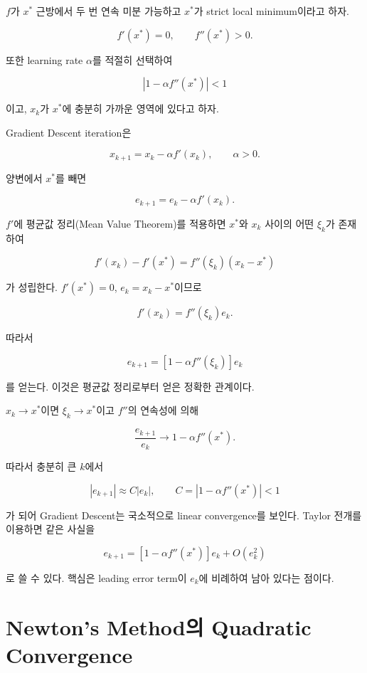 \documentclass[11pt,a4paper]{article}
\begin{document}
$f$가 $x^*$ 근방에서 두 번 연속 미분 가능하고 $x^*$가 strict local minimum이라고 하자.

\[
    f'(x^*)=0,
    \qquad
    f''(x^*)>0.
\]

또한 learning rate $\alpha$를 적절히 선택하여

\[
    |1-\alpha f''(x^*)|<1
\]

이고, $x_k$가 $x^*$에 충분히 가까운 영역에 있다고 하자.

Gradient Descent iteration은

\[
    x_{k+1}=x_k-\alpha f'(x_k),
    \qquad \alpha>0.
\]

양변에서 $x^*$를 빼면

\[
    e_{k+1}
    =
    e_k-\alpha f'(x_k).
\]

$f'$에 평균값 정리(Mean Value Theorem)를 적용하면 $x^*$와 $x_k$ 사이의
어떤 $\xi_k$가 존재하여

\[
    f'(x_k)-f'(x^*)
    =
    f''(\xi_k)(x_k-x^*)
\]

가 성립한다. $f'(x^*)=0$, $e_k=x_k-x^*$이므로

\[
    f'(x_k)=f''(\xi_k)e_k.
\]

따라서

\[
    \boxed{
    e_{k+1}
    =
    \left[1-\alpha f''(\xi_k)\right]e_k
    }
\]

를 얻는다. 이것은 평균값 정리로부터 얻은 정확한 관계이다.

$x_k\to x^*$이면 $\xi_k\to x^*$이고 $f''$의 연속성에 의해

\[
    \frac{e_{k+1}}{e_k}
    \longrightarrow
    1-\alpha f''(x^*).
\]

따라서 충분히 큰 $k$에서

\[
    |e_{k+1}|
    \approx
    C|e_k|,
    \qquad
    C=|1-\alpha f''(x^*)|<1
\]

가 되어 Gradient Descent는 국소적으로 linear convergence를 보인다.
Taylor 전개를 이용하면 같은 사실을

\[
    e_{k+1}
    =
    \left[1-\alpha f''(x^*)\right]e_k
    +
    O(e_k^2)
\]

로 쓸 수 있다. 핵심은 leading error term이 $e_k$에 비례하여 남아 있다는 점이다.


\section{Newton's Method의 Quadratic Convergence}
\end{document}
